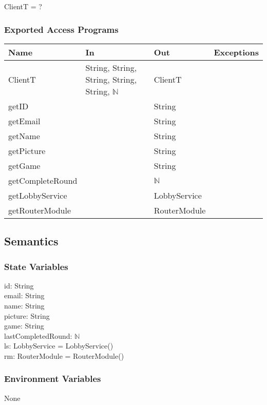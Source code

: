 \documentclass[12pt, titlepage]{article}
\begin{document}
ClientT = ?

\subsubsection{Exported Access Programs}

\begin{center}
\begin{tabular}{ |  p{4cm} | p{3cm} |  p{3cm} | p{5cm} | }
\hline
\textbf{Name} & \textbf{In} & \textbf{Out} & \textbf{Exceptions} \\
\hline
ClientT & String, String, String, String, String, $\mathbb{N}$  &  ClientT &  \\
getID & & String & \\
getEmail & & String & \\
getName & & String & \\
getPicture & & String & \\
getGame & & String & \\
getCompleteRound & & $\mathbb{N}$ & \\
getLobbyService & & LobbyService & \\
getRouterModule & & RouterModule & \\

\hline
\end{tabular}
\end{center}


\subsection{Semantics}

\subsubsection{State Variables}

id: String\\
email: String\\
name: String\\
picture: String\\
game: String\\
lastCompletedRound: $\mathbb{N}$\\
ls: LobbyService = LobbyService() \\
rm: RouterModule = RouterModule() 


\subsubsection{Environment Variables}
None
\end{document}
